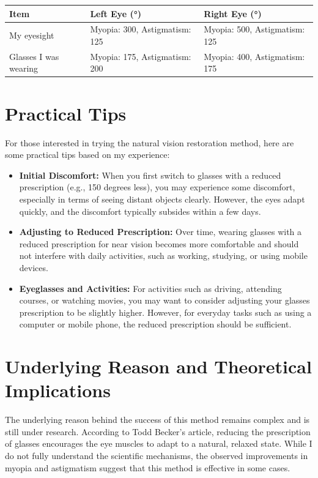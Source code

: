 \documentclass[12pt]{article}
\begin{document}
\begin{tabularx}{\textwidth}{|X|X|X|}
\hline
\textbf{Item} & \textbf{Left Eye (°)} & \textbf{Right Eye (°)} \\
\hline
My eyesight & Myopia: 300, Astigmatism: 125 & Myopia: 500, Astigmatism: 125 \\
Glasses I was wearing & Myopia: 175, Astigmatism: 200 & Myopia: 400, Astigmatism: 175 \\
\hline
\end{tabularx}

\section{Practical Tips}
For those interested in trying the natural vision restoration method, here are some practical tips based on my experience:
\begin{itemize}
    \item \textbf{Initial Discomfort:} When you first switch to glasses with a reduced prescription (e.g., 150 degrees less), you may experience some discomfort, especially in terms of seeing distant objects clearly. However, the eyes adapt quickly, and the discomfort typically subsides within a few days.
    \item \textbf{Adjusting to Reduced Prescription:} Over time, wearing glasses with a reduced prescription for near vision becomes more comfortable and should not interfere with daily activities, such as working, studying, or using mobile devices.
    \item \textbf{Eyeglasses and Activities:} For activities such as driving, attending courses, or watching movies, you may want to consider adjusting your glasses prescription to be slightly higher. However, for everyday tasks such as using a computer or mobile phone, the reduced prescription should be sufficient.
\end{itemize}

\section{Underlying Reason and Theoretical Implications}
The underlying reason behind the success of this method remains complex and is still under research. According to Todd Becker's article, reducing the prescription of glasses encourages the eye muscles to adapt to a natural, relaxed state. While I do not fully understand the scientific mechanisms, the observed improvements in myopia and astigmatism suggest that this method is effective in some cases.
\end{document}
